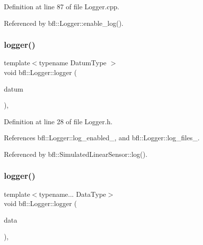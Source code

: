 Definition at line 87 of file Logger.\+cpp.



Referenced by bfl\+::\+Logger\+::enable\+\_\+log().

\mbox{\label{classbfl_1_1Logger_a1033ff31398484f2132f84fd140da9e3}} 
\subsubsection{\texorpdfstring{logger()}{logger()}\hspace{0.1cm}{\footnotesize\ttfamily [1/4]}}
{\footnotesize\ttfamily template$<$typename Datum\+Type $>$ \\
void bfl\+::\+Logger\+::logger (\begin{DoxyParamCaption}\item[{Datum\+Type}]{datum }\end{DoxyParamCaption})\hspace{0.3cm}{\ttfamily [inline]}, {\ttfamily [inherited]}}



Definition at line 28 of file Logger.\+h.



References bfl\+::\+Logger\+::log\+\_\+enabled\+\_\+, and bfl\+::\+Logger\+::log\+\_\+files\+\_\+.



Referenced by bfl\+::\+Simulated\+Linear\+Sensor\+::log().

\mbox{\label{classbfl_1_1Logger_aca2086c9256e5c404872b91f7f25b97d}} 
\subsubsection{\texorpdfstring{logger()}{logger()}\hspace{0.1cm}{\footnotesize\ttfamily [2/4]}}
{\footnotesize\ttfamily template$<$typename... Data\+Type$>$ \\
void bfl\+::\+Logger\+::logger (\begin{DoxyParamCaption}\item[{Data\+Type...}]{data }\end{DoxyParamCaption})\hspace{0.3cm}{\ttfamily [inline]}, {\ttfamily [inherited]}}



